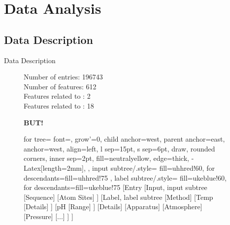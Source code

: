 \section{Data Analysis}

\subsection{Data Description}
\begin{frame}{Data Description}
	\begin{figure}
	\centering
	\begin{minipage}{.49\textwidth}
		Number of entries: 196743 \\
		Number of features: 612 \\
		
		Features related to : 2 \\
		Features related to : 18 \\
		\begin{center}
		\textbf{BUT!}
		\end{center}
	\end{minipage}%
	\begin{minipage}{.5\textwidth}
		\scriptsize
		\begin{forest}
			for tree={
				font=\scriptsize,
				grow'=0,
				child anchor=west,
				parent anchor=east,
				anchor=west,
				align=left,
				l sep=15pt,
				s sep=6pt,
				draw,
				rounded corners,
				inner sep=2pt,
				fill=neutralyellow,
				edge={thick, -{Latex[length=2mm]}},
			},
			input subtree/.style={
				fill=uhhred!60,
				for descendants={fill=uhhred!75} %
			},
			label subtree/.style={
				fill=ukeblue!60,
				for descendants={fill=ukeblue!75}
			}
			[Entry
			[Input, input subtree
			[Sequence]
			[Atom Sites]
			]
			[Label, label subtree
			[Method]
			[Temp
			[Details]
			]
			[pH
			[Range]
			]
			[Details]
			[Apparatus]
			[Atmosphere]
			[Pressure]
			[...]
			]
			]
		\end{forest}		
	\end{minipage}
\end{figure}
\end{frame}

